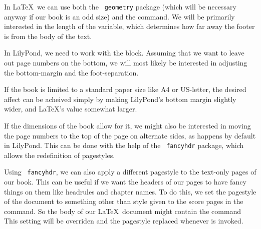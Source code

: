 \documentclass[../../LilyPond-Tutorials]{subfiles}
\begin{document}
In \LaTeX\ we can use both the \texttt{ geometry} package (which will be necessary anyway if our book is an odd size) and the  command. We will be primarily interested in the length of the  variable, which determines how far away the footer is from the body of the text.

In LilyPond, we need to work with the  block. Assuming that we want to leave out page numbers on the bottom, we will most likely be interested in adjusting the  bottom-margin and the foot-separation.

If the book is limited to a standard paper size like A4 or US-letter, the desired affect can be acheived simply by making LilyPond's bottom margin slightly wider, and \LaTeX's  value somewhat larger.

If the dimensions of the book allow for it, we might also be interested in moving the page numbers to the top of the page on alternate sides, as happens by default in LilyPond. This can be done with the help of the \texttt{ fancyhdr} package, which allows the redefinition of pagestyles. 

Using \texttt{ fancyhdr}, we can also apply a different pagestyle to the text-only pages of our book. This can be useful if we want the headers of our pages to have fancy things on them  like headrules and chapter names. To do this, we set the pagestyle of the document to something other than style given to the score pages in the   command. So the body of our \LaTeX\ document might contain the command  This setting will be overriden and the pagestyle replaced whenever  is invoked.
\end{document}
